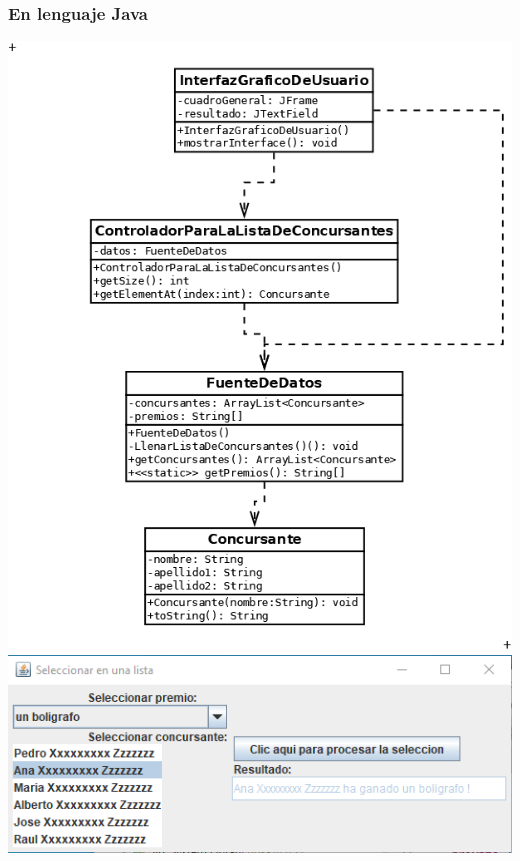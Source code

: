\documentclass[spanish,12pt,a4paper,final,oneside]{book}
\begin{document}
\subsubsection*{En lenguaje Java} \lstset{language=Java} 
\includegraphics[width=\textwidth]{Seleccion Plana - diagrama de clases}
\includegraphics[width=\textwidth]{Seleccion Plana - pantallazo - Java}






\end{document}
